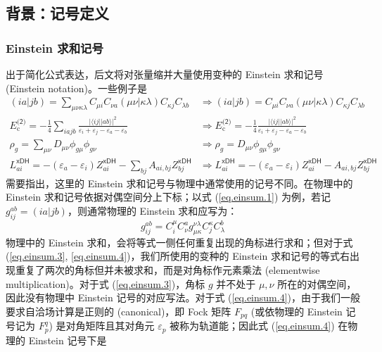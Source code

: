 \subsection{背景：记号定义}

\subsubsection{Einstein 求和记号}

出于简化公式表达，后文将对张量缩并大量使用变种的 Einstein 求和记号 (Einstein notation)。一些例子是
\begin{subequations}
\begin{align}
  \label{eq.einsum.1}
  (ia|jb) = \sum_{\mu \nu \kappa \lambda} C_{\mu i} C_{\nu a} (\mu \nu | \kappa \lambda) C_{\kappa j} C_{\lambda b}
  &\Rightarrow 
  (ia|jb) = C_{\mu i} C_{\nu a} (\mu \nu | \kappa \lambda) C_{\kappa j} C_{\lambda b} \\
  \label{eq.einsum.2}
  E_\mathrm{c}^\textsf{(2)} = - \frac{1}{4} \sum_{iajb} \frac{\big| \langle i j || a b \rangle \big|^2}{\varepsilon_i + \varepsilon_j - \varepsilon_a - \varepsilon_b}
  &\Rightarrow
  E_\mathrm{c}^\textsf{(2)} = - \frac{1}{4} \frac{\big| \langle i j || a b \rangle \big|^2}{\varepsilon_i + \varepsilon_j - \varepsilon_a - \varepsilon_b} \\
  \label{eq.einsum.3}
  \rho_g = \sum_{\mu \nu} D_{\mu \nu} \phi_{g \mu} \phi_{g \nu}
  &\Rightarrow
  \rho_g = D_{\mu \nu} \phi_{g \mu} \phi_{g \nu} \\
  \label{eq.einsum.4}
  L_{ai}^\textsf{xDH} = - (\varepsilon_a - \varepsilon_i) Z_{ai}^\textsf{xDH} - \sum_{bj} A_{ai, bj} Z_{bj}^\textsf{xDH}
  &\Rightarrow
  L_{ai}^\textsf{xDH} = - (\varepsilon_a - \varepsilon_i) Z_{ai}^\textsf{xDH} - A_{ai, bj} Z_{bj}^\textsf{xDH}
\end{align}
\end{subequations}
需要指出，这里的 Einstein 求和记号与物理中通常使用的记号不同\cite{Einstein-Einstein.AP.1916}。在物理中的 Einstein 求和记号依据对偶空间分上下标；以式 (\ref{eq.einsum.1}) 为例，若记 $g_{ij}^{ab} = (ia|jb)$，则通常物理的 Einstein 求和应写为：
\begin{equation*}
  g_{ij}^{ab} = C^\mu_i C^a_\nu g^{\nu \lambda}_{\mu \kappa} C^\kappa_j C^b_\lambda
\end{equation*}
物理中的 Einstein 求和，会将等式一侧任何重复出现的角标进行求和；但对于式 (\ref{eq.einsum.3}, \ref{eq.einsum.4})，我们所使用的变种的 Einstein 求和记号的等式右出现重复了两次的角标但并未被求和，而是对角标作元素乘法 (elementwise multiplication)。对于式 (\ref{eq.einsum.3})，角标 $g$ 并不处于 $\mu, \nu$ 所在的对偶空间，因此没有物理中 Einstein 记号的对应写法。对于式 (\ref{eq.einsum.4})，由于我们一般要求自洽场计算是正则的 (canonical)，即 Fock 矩阵 $F_{pq}$ (或依物理的 Einstein 记号记为 $F_p^q$) 是对角矩阵且其对角元 $\varepsilon_p$ 被称为轨道能；因此式 (\ref{eq.einsum.4}) 在物理的 Einstein 记号下是
